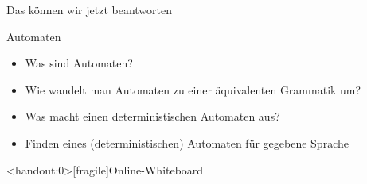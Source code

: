 \begin{frame}[fragile]{Das können wir jetzt beantworten}
  \begin{alertblock}{Automaten}
    \begin{itemize}
      \item Was sind Automaten?
      \item Wie wandelt man Automaten zu einer äquivalenten Grammatik um?
      \item Was macht einen deterministischen Automaten aus?
      \item Finden eines (deterministischen) Automaten für gegebene Sprache
    \end{itemize}
  \end{alertblock}
\end{frame}




\appendix
\begin{frame}<handout:0>[fragile]{Online-Whiteboard}
  \phantom{text}
\end{frame}


